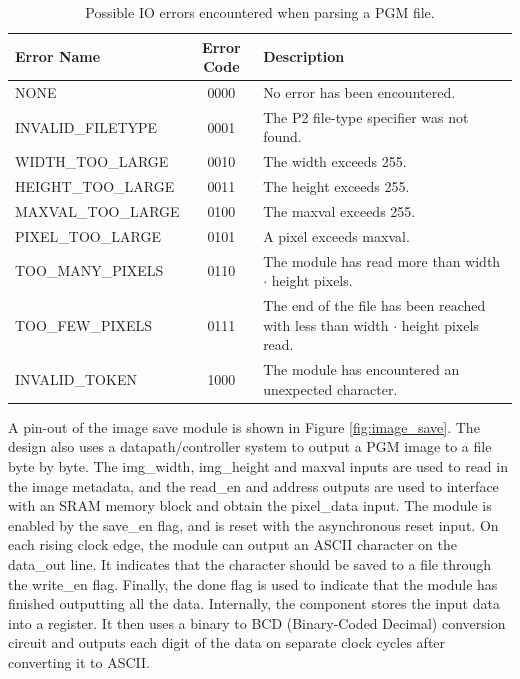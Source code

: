 \documentclass[a4paper, 10pt, titlepage]{article}
\begin{document}
\begin{table}[htb]
    \centering
    \begin{tabular}[c]{ l | c | p{8cm} }
        \textbf{Error Name} & \textbf{Error Code} & \textbf{Description} \\
        \hline
        NONE & 0000 & No error has been encountered. \\
        INVALID\_FILETYPE & 0001 & The P2 file-type specifier was not found. \\
        WIDTH\_TOO\_LARGE & 0010 & The width exceeds 255. \\
        HEIGHT\_TOO\_LARGE & 0011 & The height exceeds 255. \\
        MAXVAL\_TOO\_LARGE & 0100 & The maxval exceeds 255. \\
        PIXEL\_TOO\_LARGE & 0101 & A pixel exceeds maxval. \\
        TOO\_MANY\_PIXELS & 0110 & The module has read more than width $\cdot$ height pixels. \\
        TOO\_FEW\_PIXELS & 0111 & The end of the file has been reached with less than width $\cdot$ height pixels read. \\
        INVALID\_TOKEN & 1000 & The module has encountered an unexpected character. \\
    \end{tabular}
    \caption{Possible IO errors encountered when parsing a PGM file.}
    \label{tab:io_error}
\end{table}

A pin-out of the image save module is shown in Figure \ref{fig:image_save}. The design also uses a datapath/controller system to output a PGM image to a file byte by byte. The img\_width, img\_height and maxval inputs are used to read in the image metadata, and the read\_en and address outputs are used to interface with an SRAM memory block and obtain the pixel\_data input. The module is enabled by the save\_en flag, and is reset with the asynchronous reset input. On each rising clock edge, the module can output an ASCII character on the data\_out line. It indicates that the character should be saved to a file through the write\_en flag. Finally, the done flag is used to indicate that the module has finished outputting all the data. Internally, the component stores the input data into a register. It then uses a binary to BCD (Binary-Coded Decimal) conversion circuit and outputs each digit of the data on separate clock cycles after converting it to ASCII.
\end{document}
